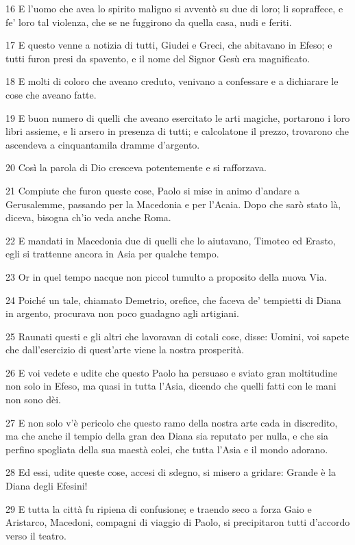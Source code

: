 \par 16 E l'uomo che avea lo spirito maligno si avventò su due di loro; li sopraffece, e fe' loro tal violenza, che se ne fuggirono da quella casa, nudi e feriti.
\par 17 E questo venne a notizia di tutti, Giudei e Greci, che abitavano in Efeso; e tutti furon presi da spavento, e il nome del Signor Gesù era magnificato.
\par 18 E molti di coloro che aveano creduto, venivano a confessare e a dichiarare le cose che aveano fatte.
\par 19 E buon numero di quelli che aveano esercitato le arti magiche, portarono i loro libri assieme, e li arsero in presenza di tutti; e calcolatone il prezzo, trovarono che ascendeva a cinquantamila dramme d'argento.
\par 20 Così la parola di Dio cresceva potentemente e si rafforzava.
\par 21 Compiute che furon queste cose, Paolo si mise in animo d'andare a Gerusalemme, passando per la Macedonia e per l'Acaia. Dopo che sarò stato là, diceva, bisogna ch'io veda anche Roma.
\par 22 E mandati in Macedonia due di quelli che lo aiutavano, Timoteo ed Erasto, egli si trattenne ancora in Asia per qualche tempo.
\par 23 Or in quel tempo nacque non piccol tumulto a proposito della nuova Via.
\par 24 Poiché un tale, chiamato Demetrio, orefice, che faceva de' tempietti di Diana in argento, procurava non poco guadagno agli artigiani.
\par 25 Raunati questi e gli altri che lavoravan di cotali cose, disse: Uomini, voi sapete che dall'esercizio di quest'arte viene la nostra prosperità.
\par 26 E voi vedete e udite che questo Paolo ha persuaso e sviato gran moltitudine non solo in Efeso, ma quasi in tutta l'Asia, dicendo che quelli fatti con le mani non sono dèi.
\par 27 E non solo v'è pericolo che questo ramo della nostra arte cada in discredito, ma che anche il tempio della gran dea Diana sia reputato per nulla, e che sia perfino spogliata della sua maestà colei, che tutta l'Asia e il mondo adorano.
\par 28 Ed essi, udite queste cose, accesi di sdegno, si misero a gridare: Grande è la Diana degli Efesini!
\par 29 E tutta la città fu ripiena di confusione; e traendo seco a forza Gaio e Aristarco, Macedoni, compagni di viaggio di Paolo, si precipitaron tutti d'accordo verso il teatro.
